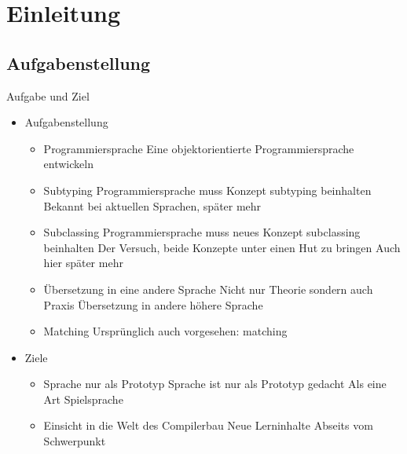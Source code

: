 \section{Einleitung}
\subsection{Aufgabenstellung}
\begin{frame}[t]{Aufgabe und Ziel}
	\begin{itemize}[<+->]
		\item Aufgabenstellung
		\begin{itemize}
			\item Programmiersprache
			 {Eine objektorientierte Programmiersprache entwickeln}

			\item Subtyping
			 {Programmiersprache muss Konzept subtyping beinhalten}
			 {Bekannt bei aktuellen Sprachen, später mehr}

			\item Subclassing
			 {Programmiersprache muss neues Konzept subclassing beinhalten}
			 {Der Versuch, beide Konzepte unter einen Hut zu bringen}
			 {Auch hier später mehr}

			\item Übersetzung in eine andere Sprache
			 {Nicht nur Theorie sondern auch Praxis}
			 {Übersetzung in andere höhere Sprache}

			\item Matching
			 {Ursprünglich auch vorgesehen: matching}
		\end{itemize}

		\item Ziele
		\begin{itemize}
			\item Sprache nur als Prototyp
			 {Sprache ist nur als Prototyp gedacht}
			 {Als eine Art Spielsprache}
			\item Einsicht in die Welt des Compilerbau
			 {Neue Lerninhalte}
			 {Abseits vom Schwerpunkt}
		\end{itemize}

	\end{itemize}

\end{frame}

